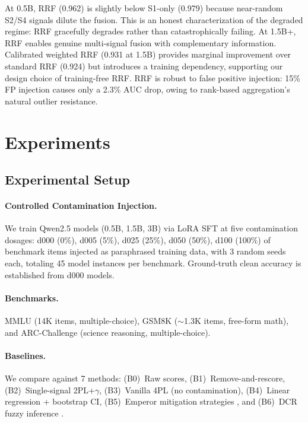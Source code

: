 \documentclass[11pt,a4paper]{article}
\begin{document}
At 0.5B, RRF (0.962) is slightly below S1-only (0.979) because near-random S2/S4 signals dilute the fusion.
This is an honest characterization of the degraded regime: RRF gracefully degrades rather than catastrophically failing.
At 1.5B+, RRF enables genuine multi-signal fusion with complementary information.
Calibrated weighted RRF (0.931 at 1.5B) provides marginal improvement over standard RRF (0.924) but introduces a training dependency, supporting our design choice of training-free RRF.
RRF is robust to false positive injection: 15\% FP injection causes only a 2.3\% AUC drop, owing to rank-based aggregation's natural outlier resistance.

\section{Experiments}
\label{sec:experiments}

\subsection{Experimental Setup}

\paragraph{Controlled Contamination Injection.}
We train Qwen2.5 models (0.5B, 1.5B, 3B) via LoRA SFT at five contamination dosages: d000 (0\%), d005 (5\%), d025 (25\%), d050 (50\%), d100 (100\%) of benchmark items injected as paraphrased training data, with 3 random seeds each, totaling 45 model instances per benchmark.
Ground-truth clean accuracy is established from d000 models.

\paragraph{Benchmarks.}
MMLU (14K items, multiple-choice), GSM8K ($\sim$1.3K items, free-form math), and ARC-Challenge (science reasoning, multiple-choice).

\paragraph{Baselines.}
We compare against 7 methods: (B0)~Raw scores, (B1)~Remove-and-rescore, (B2)~Single-signal 2PL+$\gamma$, (B3)~Vanilla 4PL (no contamination), (B4)~Linear regression + bootstrap CI, (B5)~Emperor mitigation strategies \citep{xu2024benchmark}, and (B6)~DCR fuzzy inference \citep{dong2024generalization}.
\end{document}
